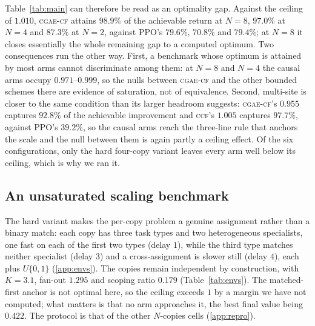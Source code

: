 \documentclass[review,authoryear,3p,times]{elsarticle}
\newcommand{\cflow}{\textsc{cgae-cf}}          %
\newcommand{\ccf}{\textsc{ccf}}
\begin{document}
Table~\ref{tab:main} can therefore be read as an optimality gap. Against the
ceiling of $1.010$, \cflow{} attains $98.9\%$ of the achievable return at
$N{=}8$, $97.0\%$ at $N{=}4$ and $87.3\%$ at $N{=}2$, against PPO's $79.6\%$,
$70.8\%$ and $79.4\%$; at $N{=}8$ it closes essentially the whole remaining gap
to a computed optimum. Two consequences run the other way. First, a benchmark
whose optimum is attained by most arms cannot discriminate among them: at
$N{=}8$ and $N{=}4$ the causal arms occupy $0.971$--$0.999$, so the nulls
between \cflow{} and the other bounded schemes there are evidence of
saturation, not of equivalence. Second, multi-site is closer to the same
condition than its larger headroom suggests: \cflow's $0.955$ captures
$92.8\%$ of the achievable improvement and \ccf's $1.005$ captures $97.7\%$,
against PPO's $39.2\%$, so the causal arms reach the three-line rule that
anchors the scale and the null between them is again partly a ceiling effect.
Of the six configurations, only the hard four-copy variant leaves every arm
well below its ceiling, which is why we ran it.

\subsection{An unsaturated scaling benchmark}
\label{sec:hard}

The hard variant makes the per-copy problem a genuine assignment rather than
a binary match: each copy has three task types and two heterogeneous
specialists, one fast on each of the first two types (delay $1$), while the
third type matches neither specialist (delay $3$) and a cross-assignment is
slower still (delay $4$), each plus $U\{0,1\}$ (\ref{app:envs}). The copies
remain independent by construction, with $K=3.1$, fan-out $1.295$ and scoping
ratio $0.179$ (Table~\ref{tab:envs}). The matched-first anchor is not optimal
here, so the ceiling exceeds $1$ by a margin we have not computed; what
matters is that no arm approaches it, the best final value being $0.422$. The
protocol is that of the other $N$-copies cells (\ref{app:repro}).
\end{document}
